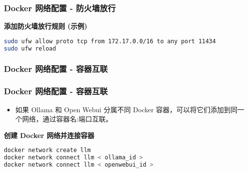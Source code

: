 \begin{frame}[fragile]
	\frametitle{Docker 网络配置 - 防火墙放行}
	\textbf{添加防火墙放行规则 (示例)}
	\begin{lstlisting}[language=bash]
sudo ufw allow proto tcp from 172.17.0.0/16 to any port 11434
sudo ufw reload
\end{lstlisting}
\end{frame}

\begin{frame}[fragile]
	\frametitle{Docker 网络配置 - 容器互联}
	\subsubsection{Docker 网络配置 - 容器互联}
	\begin{itemize}
		\item 如果 Ollama 和 Open Webui 分属不同 Docker 容器，可以将它们添加到同一个网络，通过容器名:端口互联。
	\end{itemize}
	\textbf{创建 Docker 网络并连接容器}
	\begin{lstlisting}[language=bash]
docker network create llm
docker network connect llm < ollama_id >
docker network connect llm < openwebui_id >
\end{lstlisting}
\end{frame}
